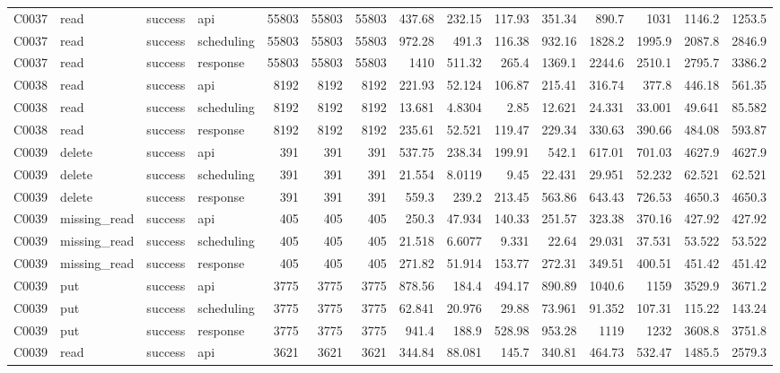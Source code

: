 \begin{landscape}
\begin{longtable}{llllrrrrrrrrrrr}
C0037 & read & success & api & 55803 & 55803 & 55803 & 437.68 & 232.15 & 117.93 & 351.34 & 890.7 & 1031 & 1146.2 & 1253.5\\
C0037 & read & success & scheduling & 55803 & 55803 & 55803 & 972.28 & 491.3 & 116.38 & 932.16 & 1828.2 & 1995.9 & 2087.8 & 2846.9\\
C0037 & read & success & response & 55803 & 55803 & 55803 & 1410 & 511.32 & 265.4 & 1369.1 & 2244.6 & 2510.1 & 2795.7 & 3386.2\\
C0038 & read & success & api & 8192 & 8192 & 8192 & 221.93 & 52.124 & 106.87 & 215.41 & 316.74 & 377.8 & 446.18 & 561.35\\
C0038 & read & success & scheduling & 8192 & 8192 & 8192 & 13.681 & 4.8304 & 2.85 & 12.621 & 24.331 & 33.001 & 49.641 & 85.582\\
C0038 & read & success & response & 8192 & 8192 & 8192 & 235.61 & 52.521 & 119.47 & 229.34 & 330.63 & 390.66 & 484.08 & 593.87\\
C0039 & delete & success & api & 391 & 391 & 391 & 537.75 & 238.34 & 199.91 & 542.1 & 617.01 & 701.03 & 4627.9 & 4627.9\\
C0039 & delete & success & scheduling & 391 & 391 & 391 & 21.554 & 8.0119 & 9.45 & 22.431 & 29.951 & 52.232 & 62.521 & 62.521\\
C0039 & delete & success & response & 391 & 391 & 391 & 559.3 & 239.2 & 213.45 & 563.86 & 643.43 & 726.53 & 4650.3 & 4650.3\\
C0039 & missing\_\allowbreak{}read & success & api & 405 & 405 & 405 & 250.3 & 47.934 & 140.33 & 251.57 & 323.38 & 370.16 & 427.92 & 427.92\\
C0039 & missing\_\allowbreak{}read & success & scheduling & 405 & 405 & 405 & 21.518 & 6.6077 & 9.331 & 22.64 & 29.031 & 37.531 & 53.522 & 53.522\\
C0039 & missing\_\allowbreak{}read & success & response & 405 & 405 & 405 & 271.82 & 51.914 & 153.77 & 272.31 & 349.51 & 400.51 & 451.42 & 451.42\\
C0039 & put & success & api & 3775 & 3775 & 3775 & 878.56 & 184.4 & 494.17 & 890.89 & 1040.6 & 1159 & 3529.9 & 3671.2\\
C0039 & put & success & scheduling & 3775 & 3775 & 3775 & 62.841 & 20.976 & 29.88 & 73.961 & 91.352 & 107.31 & 115.22 & 143.24\\
C0039 & put & success & response & 3775 & 3775 & 3775 & 941.4 & 188.9 & 528.98 & 953.28 & 1119 & 1232 & 3608.8 & 3751.8\\
C0039 & read & success & api & 3621 & 3621 & 3621 & 344.84 & 88.081 & 145.7 & 340.81 & 464.73 & 532.47 & 1485.5 & 2579.3\\

\end{longtable}
\end{landscape}

